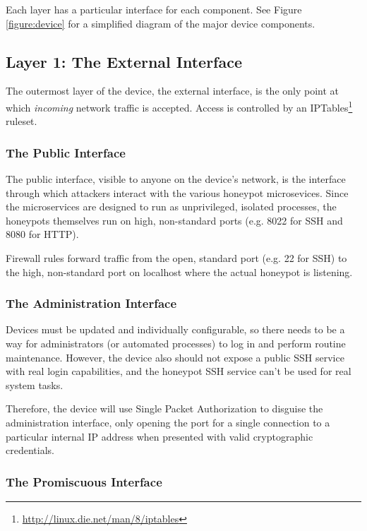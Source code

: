 Each layer has a particular interface for each component. See Figure
\ref{figure:device} for a simplified diagram of the major device components.

\subsection{Layer 1: The External Interface}

The outermost layer of the device, the external interface, is the only point at
which \textit{incoming} network traffic is accepted. Access is controlled
by an IPTables\footnote{\url{http://linux.die.net/man/8/iptables}}
ruleset.

\subsubsection{The Public Interface}

The public interface, visible to anyone on the device's network, is the
interface through which attackers interact with the various honeypot
microsevices. Since the microservices are designed to run as unprivileged,
isolated processes, the honeypots themselves run on high, non-standard
ports (e.g. 8022 for SSH and 8080 for HTTP).

Firewall rules forward traffic from the open, standard port (e.g. 22 for SSH)
to the high, non-standard port on localhost where the actual honeypot
is listening.

\subsubsection{The Administration Interface}

Devices must be updated and individually configurable, so there needs to be a
way for administrators (or automated processes) to log in and perform routine 
maintenance. However, the device also should not expose a public SSH service
with real login capabilities, and the honeypot SSH service can't be used for
real system tasks.

Therefore, the device will use Single Packet Authorization
to disguise the administration interface, only opening the port for a single
connection to a particular internal IP address when presented with valid
cryptographic credentials.

\subsubsection{The Promiscuous Interface}

